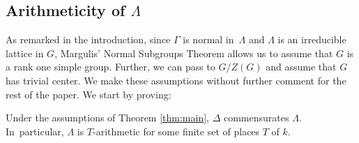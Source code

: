 \subsection{Arithmeticity of $\Lambda$}\label{sec:arithm}
As remarked in the introduction, since $\Gamma$ is normal in~$\Lambda$ and $\Lambda$ is an irreducible lattice in $G$, Margulis' Normal Subgroups Theorem allows us to assume that $G$ is a rank one simple group. Further, we can pass to $G/Z(G)$ and assume that $G$ has trivial center. We make these assumptions without further comment for the rest of the paper. We start by proving:
\begin{prop}\label{prop:Lambda-arithm}
Under the assumptions of Theorem \ref{thm:main}, $\Delta$ commensurates $\Lambda$. In~particular, $\Lambda$ is $T$-arithmetic for some finite set of places $T$ of $k$.
\end{prop}
